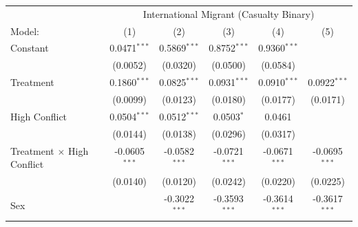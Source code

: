 \begingroup
\centering
\renewcommand{\arraystretch}{0.75}   %
\setlength{\aboverulesep}{0pt}       %
\setlength{\belowrulesep}{0pt} 
\begin{tabular}{lccccc}
   \tabularnewline \midrule \midrule
    & \multicolumn{5}{c}{International Migrant (Casualty Binary)}\\
                                                            
   Model:                                                  & (1)             & (2)                            & (3)                     & (4)                     & (5)\\  
   \midrule
  
   Constant                                                & 0.0471$^{***}$  & 0.5869$^{***}$                 & 0.8752$^{***}$          & 0.9360$^{***}$          &   \\   
                                                           & (0.0052)        & (0.0320)                       & (0.0500)                & (0.0584)                &   \\   
   Treatment                                               & 0.1860$^{***}$  & 0.0825$^{***}$                 & 0.0931$^{***}$          & 0.0910$^{***}$          & 0.0922$^{***}$\\   
                                                           & (0.0099)        & (0.0123)                       & (0.0180)                & (0.0177)                & (0.0171)\\   
   High Conflict                        & 0.0504$^{***}$  & 0.0512$^{***}$                 & 0.0503$^{*}$            & 0.0461                  &   \\   
                                                           & (0.0144)        & (0.0138)                       & (0.0296)                & (0.0317)                &   \\   
   Treatment $\times$ High Conflict     & -0.0605$^{***}$ & -0.0582$^{***}$                & -0.0721$^{***}$         & -0.0671$^{***}$         & -0.0695$^{***}$\\   
                                                           & (0.0140)        & (0.0120)                       & (0.0242)                & (0.0220)                & (0.0225)\\   
   Sex                                                     &                 & -0.3022$^{***}$                & -0.3593$^{***}$         & -0.3614$^{***}$         & -0.3617$^{***}$\\   

\end{tabular}
